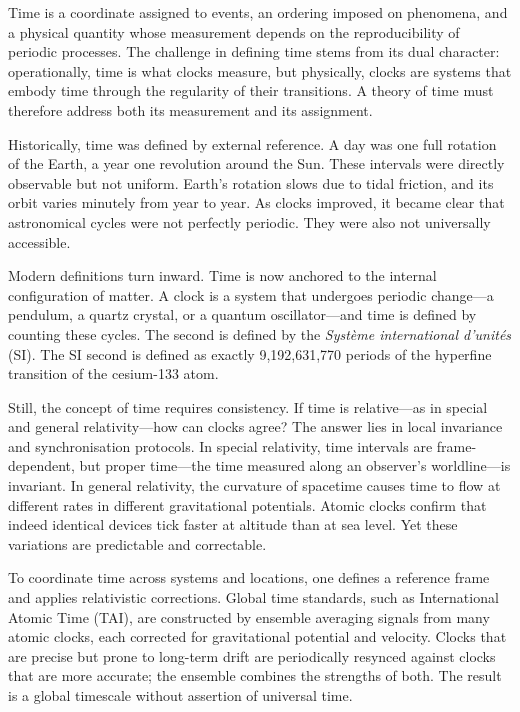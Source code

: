 Time is a coordinate assigned to events, an ordering imposed on phenomena, and a physical quantity whose measurement depends on the reproducibility of periodic processes. The challenge in defining time stems from its dual character: operationally, time is what clocks measure, but physically, clocks are systems that embody time through the regularity of their transitions. A theory of time must therefore address both its measurement and its assignment.

Historically, time was defined by external reference. A day was one full rotation of the Earth, a year one revolution around the Sun. These intervals were directly observable but not uniform. Earth's rotation slows due to tidal friction, and its orbit varies minutely from year to year. As clocks improved, it became clear that astronomical cycles were not perfectly periodic. They were also not universally accessible.

Modern definitions turn inward. Time is now anchored to the internal configuration of matter. A clock is a system that undergoes periodic change—a pendulum, a quartz crystal, or a quantum oscillator—and time is defined by counting these cycles. The second is defined by the \textit{Système international d’unités} (SI). The SI second is defined as exactly 9,192,631,770 periods of the hyperfine transition of the cesium-133 atom.

Still, the concept of time requires consistency. If time is relative—as in special and general relativity—how can clocks agree? The answer lies in local invariance and synchronisation protocols. In special relativity, time intervals are frame-dependent, but proper time—the time measured along an observer’s worldline—is invariant. In general relativity, the curvature of spacetime causes time to flow at different rates in different gravitational potentials. Atomic clocks confirm that indeed identical devices tick faster at altitude than at sea level. Yet these variations are predictable and correctable.

To coordinate time across systems and locations, one defines a reference frame and applies relativistic corrections. Global time standards, such as International Atomic Time (TAI), are constructed by ensemble averaging signals from many atomic clocks, each corrected for gravitational potential and velocity. Clocks that are precise but prone to long-term drift are periodically resynced against clocks that are more accurate; the ensemble combines the strengths of both. The result is a global timescale without assertion of universal time. 

